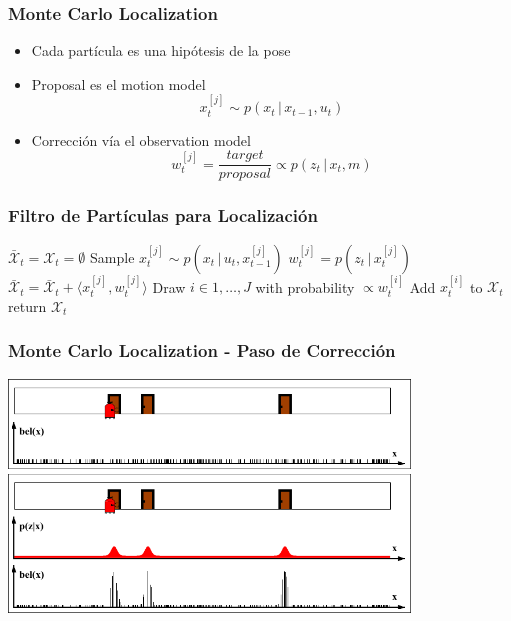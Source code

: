 
\begin{frame}
    \frametitle{Monte Carlo Localization}
    \begin{itemize}
        \item Cada partícula es una hipótesis de la pose
        \item Proposal es el motion model
        \begin{equation*}
            x_t^{[j]} \sim p(x_t \, | \, x_{t-1}, u_t)
        \end{equation*}
        \item Corrección vía el observation model
        \begin{equation*}
            w_t^{[j]} = \frac{target}{proposal} \propto p(z_t \, | \, x_t, m)
        \end{equation*}
    \end{itemize}
\end{frame}

    
\begin{frame}
    \frametitle{Filtro de Partículas para Localización}
    \begin{algorithmic}[1]
        \State $\bar{\mathcal{X}}_t = \mathcal{X}_t = \emptyset$
            \State Sample $x_t^{[j]} \sim p(x_t \, | \, u_t, x_{t-1}^{[j]})$
            \State $w_t^{[j]} = p(z_t \, | \, x_t^{[j]})$
            \State $\bar{\mathcal{X}}_t = \bar{\mathcal{X}}_t + \langle x_t^{[j]}, w_t^{[j]}\rangle$
        \EndFor
            \State Draw $i \in 1,\ldots,J$ with probability $\propto w_t^{[i]}$
            \State Add $x_t^{[i]}$ to $\mathcal{X}_t$
        \EndFor
        \State return $\mathcal{X}_t$
    \EndProcedure
    \end{algorithmic}
\end{frame}
    
\begin{frame}
    \frametitle{Monte Carlo Localization - Paso de Corrección}

    \begin{center}
        \includegraphics[width=0.8\textwidth]{./images/particle_filter/monte_carlo_correction.pdf}
    \end{center}

\end{frame}

